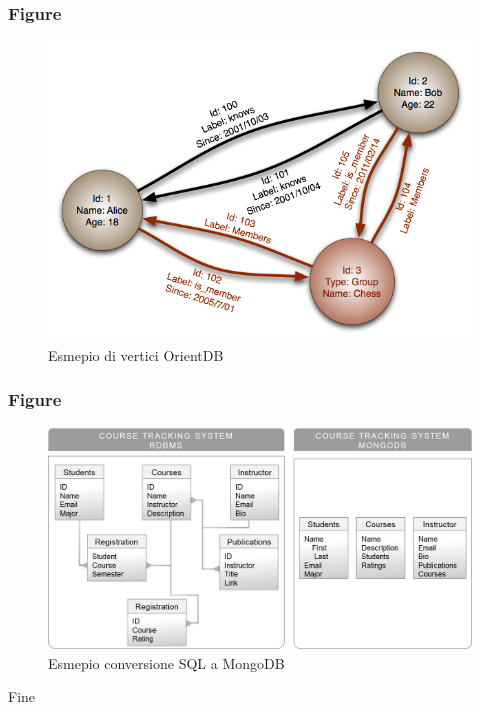 \documentclass{beamer}
\begin{document}
\begin{frame}
\frametitle{Figure}
\begin{figure}
\includegraphics[width=0.8\linewidth]{GraphDatabase_PropertyGraph.png}
\caption{Esmepio di vertici OrientDB}
\end{figure}
\end{frame}


\begin{frame}
\frametitle{Figure}
\begin{figure}
\includegraphics[width=0.8\linewidth]{01_mongodb_courses.png}
\caption{Esmepio conversione SQL a MongoDB}
\end{figure}
\end{frame}





\begin{frame}
\Huge{\centerline{Fine}}
\end{frame}

\end{document}
